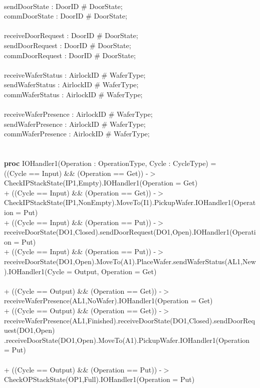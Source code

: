 \documentclass[a4paper,12pt]{article}
\begin{document}
\\	  sendDoorState : DoorID \# DoorState;
\\		commDoorState : DoorID \# DoorState;
\\
\\	  receiveDoorRequest : DoorID \# DoorState;
\\		sendDoorRequest : DoorID \# DoorState;
\\		commDoorRequest : DoorID \# DoorState;
\\
\\	  receiveWaferStatus : AirlockID \# WaferType;
\\		sendWaferStatus : AirlockID \# WaferType;
\\		commWaferStatus : AirlockID \# WaferType;
\\
\\	  receiveWaferPresence : AirlockID \# WaferType;
\\		sendWaferPresence : AirlockID \# WaferType;
\\		commWaferPresence : AirlockID \# WaferType;
\\
\\
\\\textbf{proc} IOHandler1(Operation : OperationType, Cycle : CycleType) = 
\\((Cycle == Input) \&\& (Operation == Get)) -$>$ CheckIPStackState(IP1,Empty).IOHandler1(Operation = Get)
\\+ ((Cycle == Input) \&\& (Operation == Get)) -$>$ CheckIPStackState(IP1,NonEmpty).MoveTo(I1).PickupWafer.IOHandler1(Operation = Put)
\\+ ((Cycle == Input) \&\& (Operation == Put)) -$>$ receiveDoorState(DO1,Closed).sendDoorRequest(DO1,Open).IOHandler1(Operation = Put)
\\+ ((Cycle == Input) \&\& (Operation == Put)) -$>$ receiveDoorState(DO1,Open).MoveTo(A1).PlaceWafer.sendWaferStatus(AL1,New).IOHandler1(Cycle = Output, Operation = Get)
\\
\\+ ((Cycle == Output) \&\& (Operation == Get)) -$>$ receiveWaferPresence(AL1,NoWafer).IOHandler1(Operation = Get)
\\+ ((Cycle == Output) \&\& (Operation == Get)) -$>$ receiveWaferPresence(AL1,Finished).receiveDoorState(DO1,Closed).sendDoorRequest(DO1,Open)
.receiveDoorState(DO1,Open).MoveTo(A1).PickupWafer.IOHandler1(Operation = Put)
\\
\\+ ((Cycle == Output) \&\& (Operation == Put)) -$>$ CheckOPStackState(OP1,Full).IOHandler1(Operation = Put)
\end{document}
